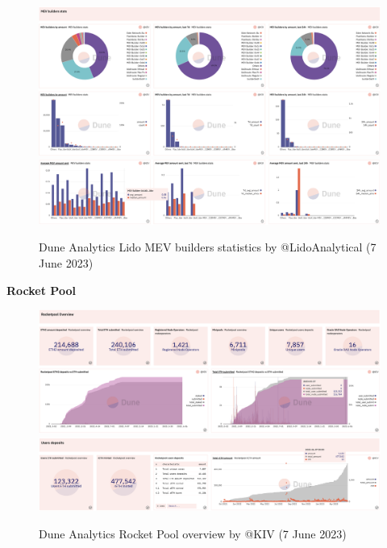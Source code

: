 \documentclass[UTF8]{article}
\begin{document}
\begin{figure}[htbp]
\begin{center}
\includegraphics[width=\linewidth]{images/dunelido4}\\
\includegraphics[width=\linewidth]{images/dunelido5}
\caption{Dune Analytics Lido MEV builders statistics by @LidoAnalytical  (7 June 2023)}
\label{fig:dunelido5}
\end{center}
\end{figure}
\noindent
\clearpage
\noindent

\textbf{Rocket Pool}
\begin{figure}[htbp]
\begin{center}
\includegraphics[width=\linewidth]{images/dunerocket1}\\
\includegraphics[width=\linewidth]{images/dunerocket2}
\caption{Dune Analytics Rocket Pool overview by @KIV  (7 June 2023)}
\label{fig:dunerocket1}
\end{center}
\end{figure}
\end{document}
